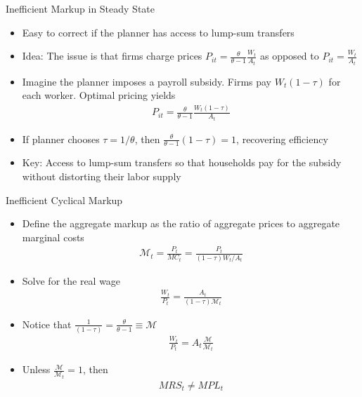 \documentclass[11pt,aspectratio=169,xcolor={dvipsnames},hyperref={pdftex,pdfpagemode=UseNone,hidelinks,pdfdisplaydoctitle=true},usepdftitle=false]{beamer}
\begin{document}
\begin{frame}{Inefficient Markup in Steady State}
\begin{itemize}
\item Easy to correct if the planner has access to lump-sum transfers
\item Idea: The issue is that firms charge prices $P_{it} = \frac{\theta}{\theta-1} \frac{W_t}{A_t}$ as opposed to $P_{it} =\frac{W_t}{A_t}$
\item Imagine the planner imposes a payroll subsidy. Firms pay $W_t(1-\tau)$ for each worker. Optimal pricing yields
\begin{align*}
 P_{it} = \frac{\theta}{\theta-1} \frac{W_t(1-\tau)}{A_t}
 \end{align*}
 \item If planner chooses $\tau = 1/\theta$, then $\frac{\theta}{\theta-1} (1-\tau) = 1$, recovering efficiency
 \item Key: Access to lump-sum transfers so that households pay for the subsidy without distorting their labor supply
 \end{itemize}
\end{frame}


\begin{frame}{Inefficient Cyclical Markup}
\begin{itemize}
\item Define the aggregate markup as the ratio of aggregate prices to aggregate marginal costs
\begin{align*}
\mathcal{M}_t = \frac{P_t}{MC_t} = \frac{P_t}{(1-\tau)W_t/A_t} 
\end{align*}
\item Solve for the real wage
\begin{align*}
\frac{W_t}{P_t} = \frac{A_t}{(1-\tau) \mathcal{M}_t}
\end{align*}
\item Notice that $\frac{1}{(1-\tau)} = \frac{\theta}{\theta-1} \equiv \mathcal{M}$
\begin{align*}
\frac{W_t}{P_t} = A_t \frac{\mathcal{M}}{\mathcal{M}_t}
\end{align*}
\item Unless $\frac{\mathcal{M}}{\mathcal{M}_t} = 1$, then
\begin{align*}
MRS_t \neq MPL_t
\end{align*}
\end{itemize}
\end{frame}
\end{document}
